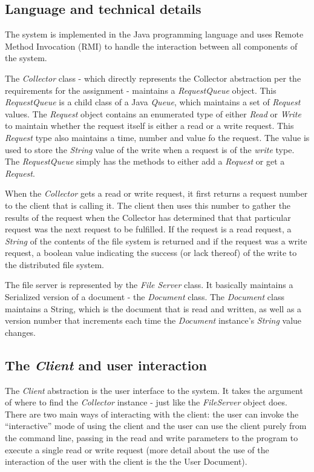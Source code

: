 \documentclass
[english,a4paper]{article}
\begin{document}
\subsection{Language and technical details}
The system is implemented in the Java programming language and uses
Remote Method Invocation (RMI) to handle the interaction between all
components of the system. 

The \emph{Collector} class - which directly represents the Collector
abstraction per the requirements for the assignment - maintains a
\emph{RequestQueue} object. This \emph{RequestQueue} is a child class
of a Java \emph{Queue}, which maintains a set of \emph{Request}
values. The \emph{Request} object contains an enumerated type of
either \emph{Read} or \emph{Write} to maintain whether the request
itself is either a read or a write request. This \emph{Request} type
also maintains a time, number and value fo the request. The value is
used to store the \emph{String} value of the write when a request is
of the \emph{write} type. The \emph{RequestQueue} simply has the
methods to either add a \emph{Request} or get a \emph{Request}.

When the \emph{Collector} gets a read or write request, it first
returns a request number to the client that is calling it. The client
then uses this number to gather the results of the request when the
Collector has determined that that particular request was the next
request to be fulfilled. If the request is a read request, a
\emph{String} of the contents of the file system is returned and if
the request was a write request, a boolean value indicating the
success (or lack thereof) of the write to the distributed file system.

The file server is represented by the \emph{File Server} class. It
basically maintains a Serialized version of a document - the
\emph{Document} class. The \emph{Document} class maintains a String,
which is the document that is read and written, as well as a version
number that increments each time the \emph{Document} instance's
\emph{String} value changes. 

\subsection{The \emph{Client} and user interaction}
The \emph{Client} abstraction is the user interface to the
system. It takes the argument of where to find the \emph{Collector}
instance - just like the \emph{FileServer} object does. There are two
main ways of interacting with the client: the user can invoke the
``interactive'' mode of using the client and the user can use the
client purely from the command line, passing in the read and write
parameters to the program to execute a single read or write request
(more detail about the use of the interaction of the user with the
client is the the User Document).
\end{document}
